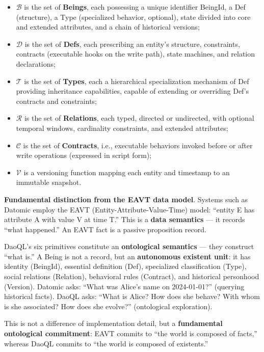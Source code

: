 \documentclass[11pt,a4paper]{article}
\begin{document}
\begin{itemize}
\tightlist
\item
  \(\mathcal{B}\) is the set of \textbf{Beings}, each possessing a
  unique identifier BeingId, a Def (structure), a Type (specialized
  behavior, optional), state divided into core and extended attributes,
  and a chain of historical versions;
\item
  \(\mathcal{D}\) is the set of \textbf{Defs}, each prescribing an
  entity's structure, constraints, contracts (executable hooks on the
  write path), state machines, and relation declarations;
\item
  \(\mathcal{T}\) is the set of \textbf{Types}, each a hierarchical
  specialization mechanism of Def providing inheritance capabilities,
  capable of extending or overriding Def's contracts and constraints;
\item
  \(\mathcal{R}\) is the set of \textbf{Relations}, each typed, directed
  or undirected, with optional temporal windows, cardinality
  constraints, and extended attributes;
\item
  \(\mathcal{C}\) is the set of \textbf{Contracts}, i.e., executable
  behaviors invoked before or after write operations (expressed in
  script form);
\item
  \(\mathcal{V}\) is a versioning function mapping each entity and
  timestamp to an immutable snapshot.
\end{itemize}

\textbf{Fundamental distinction from the EAVT data model}. Systems such
as Datomic employ the EAVT (Entity-Attribute-Value-Time) model: ``entity
E has attribute A with value V at time T.'' This is a \textbf{data
semantics} --- it records ``what happened.'' An EAVT fact is a passive
proposition record.

DaoQL's six primitives constitute an \textbf{ontological semantics} ---
they construct ``what is.'' A Being is not a record, but an
\textbf{autonomous existent unit}: it has identity (BeingId), essential
definition (Def), specialized classification (Type), social relations
(Relation), behavioral rules (Contract), and historical personhood
(Version). Datomic asks: ``What was Alice's name on 2024-01-01?''
(querying historical facts). DaoQL asks: ``What is Alice? How does she
behave? With whom is she associated? How does she evolve?'' (ontological
exploration).

This is not a difference of implementation detail, but a
\textbf{fundamental ontological commitment}: EAVT commits to ``the world
is composed of facts,'' whereas DaoQL commits to ``the world is composed
of existents.''
\end{document}
